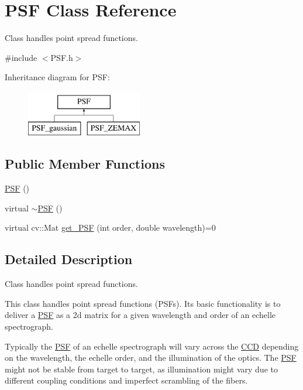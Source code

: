 \hypertarget{class_p_s_f}{}\section{P\+SF Class Reference}
\label{class_p_s_f}


Class handles point spread functions.  




{\ttfamily \#include $<$P\+S\+F.\+h$>$}

Inheritance diagram for P\+SF\+:\begin{figure}[H]
\begin{center}
\leavevmode
\includegraphics[height=2.000000cm]{class_p_s_f}
\end{center}
\end{figure}
\subsection*{Public Member Functions}
\begin{DoxyCompactItemize}
\item 
\hyperlink{class_p_s_f_ae71c0e4726ca7813fdcc3fe55b67d6d9}{P\+SF} ()
\item 
virtual \hyperlink{class_p_s_f_a3e8372a6dc5cc4a547ad6c92aa358807}{$\sim$\+P\+SF} ()
\item 
virtual cv\+::\+Mat \hyperlink{class_p_s_f_a136bdda01aeb3e8f2fc3554aa7d8be06}{get\+\_\+\+P\+SF} (int order, double wavelength)=0
\end{DoxyCompactItemize}


\subsection{Detailed Description}
Class handles point spread functions. 

This class handles point spread functions (P\+S\+Fs). It\textquotesingle{}s basic functionality is to deliver a \hyperlink{class_p_s_f}{P\+SF} as a 2d matrix for a given wavelength and order of an echelle spectrograph.

Typically the \hyperlink{class_p_s_f}{P\+SF} of an echelle spectrograph will vary across the \hyperlink{class_c_c_d}{C\+CD} depending on the wavelength, the echelle order, and the illumination of the optics. The \hyperlink{class_p_s_f}{P\+SF} might not be stable from target to target, as illumination might vary due to different coupling conditions and imperfect scrambling of the fibers.

